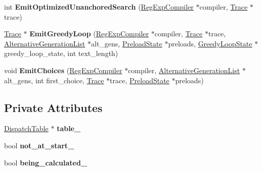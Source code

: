 \begin{DoxyCompactItemize}
\item 
int {\bfseries Emit\+Optimized\+Unanchored\+Search} (\hyperlink{classv8_1_1internal_1_1_reg_exp_compiler}{Reg\+Exp\+Compiler} $\ast$compiler, \hyperlink{classv8_1_1internal_1_1_trace}{Trace} $\ast$trace)\hypertarget{classv8_1_1internal_1_1_choice_node_a04af494c1986e3bf4589ac8386afd505}{}\label{classv8_1_1internal_1_1_choice_node_a04af494c1986e3bf4589ac8386afd505}

\item 
\hyperlink{classv8_1_1internal_1_1_trace}{Trace} $\ast$ {\bfseries Emit\+Greedy\+Loop} (\hyperlink{classv8_1_1internal_1_1_reg_exp_compiler}{Reg\+Exp\+Compiler} $\ast$compiler, \hyperlink{classv8_1_1internal_1_1_trace}{Trace} $\ast$trace, \hyperlink{classv8_1_1internal_1_1_alternative_generation_list}{Alternative\+Generation\+List} $\ast$alt\+\_\+gens, \hyperlink{structv8_1_1internal_1_1_preload_state}{Preload\+State} $\ast$preloads, \hyperlink{classv8_1_1internal_1_1_greedy_loop_state}{Greedy\+Loop\+State} $\ast$greedy\+\_\+loop\+\_\+state, int text\+\_\+length)\hypertarget{classv8_1_1internal_1_1_choice_node_a698c9006b790fb3178fb0f81bfc47a78}{}\label{classv8_1_1internal_1_1_choice_node_a698c9006b790fb3178fb0f81bfc47a78}

\item 
void {\bfseries Emit\+Choices} (\hyperlink{classv8_1_1internal_1_1_reg_exp_compiler}{Reg\+Exp\+Compiler} $\ast$compiler, \hyperlink{classv8_1_1internal_1_1_alternative_generation_list}{Alternative\+Generation\+List} $\ast$alt\+\_\+gens, int first\+\_\+choice, \hyperlink{classv8_1_1internal_1_1_trace}{Trace} $\ast$trace, \hyperlink{structv8_1_1internal_1_1_preload_state}{Preload\+State} $\ast$preloads)\hypertarget{classv8_1_1internal_1_1_choice_node_a937fb2bf4baa5d3b18ccd73f5841076f}{}\label{classv8_1_1internal_1_1_choice_node_a937fb2bf4baa5d3b18ccd73f5841076f}

\end{DoxyCompactItemize}
\subsection*{Private Attributes}
\begin{DoxyCompactItemize}
\item 
\hyperlink{classv8_1_1internal_1_1_dispatch_table}{Dispatch\+Table} $\ast$ {\bfseries table\+\_\+}\hypertarget{classv8_1_1internal_1_1_choice_node_a51de4b09b1a6c770d59bb0cffb2efecf}{}\label{classv8_1_1internal_1_1_choice_node_a51de4b09b1a6c770d59bb0cffb2efecf}

\item 
bool {\bfseries not\+\_\+at\+\_\+start\+\_\+}\hypertarget{classv8_1_1internal_1_1_choice_node_adc99630b98db0aa3c2db06fb33c165bc}{}\label{classv8_1_1internal_1_1_choice_node_adc99630b98db0aa3c2db06fb33c165bc}

\item 
bool {\bfseries being\+\_\+calculated\+\_\+}\hypertarget{classv8_1_1internal_1_1_choice_node_a6758d9e6561e5ff49088b691d4894344}{}\label{classv8_1_1internal_1_1_choice_node_a6758d9e6561e5ff49088b691d4894344}

\end{DoxyCompactItemize}
